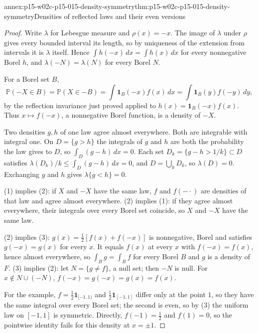 \begin{annexitem}{annex:p15-w02c-p15-015-density-symmetry}{thm:p15-w02c-p15-015-density-symmetry}{Densities of reflected laws and their even versions}
\begin{proof}
Write \(\lambda\) for Lebesgue measure and \(\rho(x)=-x\). The image
of \(\lambda\) under \(\rho\) gives every bounded interval its length,
so by uniqueness of the extension from intervals it is \(\lambda\)
itself. Hence \(\int h(-x)\,dx=\int h(x)\,dx\) for every nonnegative
Borel \(h\), and \(\lambda(-N)=\lambda(N)\) for every Borel \(N\).

For a Borel set \(B\),
\[
 \mathbb P(-X\in B)=\mathbb P(X\in-B)
   =\int\mathbf1_B(-x)f(x)\,dx
   =\int\mathbf1_B(y)f(-y)\,dy,
\]
by the reflection invariance just proved applied to
\(h(x)=\mathbf1_B(-x)f(x)\). Thus \(x\mapsto f(-x)\), a nonnegative
Borel function, is a density of \(-X\).

Two densities \(g,h\) of one law agree almost everywhere. Both are
integrable with integral one. On \(D=\{g>h\}\) the integrals of \(g\)
and \(h\) are both the probability the law gives to \(D\), so
\(\int_D(g-h)\,dx=0\).
Each set \(D_k=\{g-h>1/k\}\subset D\) satisfies
\(\lambda(D_k)/k\leq\int_D(g-h)\,dx=0\), and \(D=\bigcup_kD_k\), so
\(\lambda(D)=0\). Exchanging \(g\) and \(h\) gives
\(\lambda\{g<h\}=0\).

(1) implies (2): if \(X\) and \(-X\) have the same law, \(f\) and
\(f(-\cdot)\) are densities of that law and agree almost everywhere.
(2) implies (1): if they agree almost everywhere, their integrals over
every Borel set coincide, so \(X\) and \(-X\) have the same law.

(2) implies (3): \(g(x)=\frac12[f(x)+f(-x)]\) is nonnegative, Borel and
satisfies \(g(-x)=g(x)\) for every \(x\). It equals \(f(x)\) at every
\(x\) with \(f(-x)=f(x)\), hence almost everywhere, so
\(\int_Bg=\int_Bf\) for every Borel \(B\) and \(g\) is a density of
\(F\).
(3) implies (2): let \(N=\{g\ne f\}\), a null set; then \(-N\) is null.
For \(x\notin N\cup(-N)\),
\(f(-x)=g(-x)=g(x)=f(x)\).

For the example, \(f=\frac12\mathbf1_{[-1,1)}\) and
\(\frac12\mathbf1_{[-1,1]}\) differ only at the point \(1\), so they
have the same integral over every Borel set; the second is even, so by
(3) the uniform law on \([-1,1]\) is symmetric. Directly,
\(f(-1)=\frac12\) and \(f(1)=0\), so the pointwise identity fails for
this density at \(x=\pm1\).
\end{proof}
\end{annexitem}


